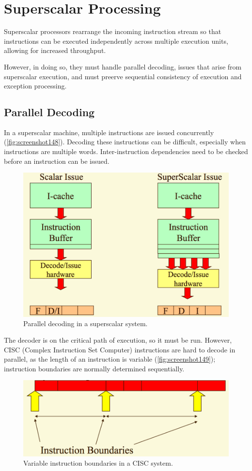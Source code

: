 \chapter{Superscalar Processing}
Superscalar processors rearrange the incoming instruction stream so that instructions can be executed independently across multiple execution units, allowing for increased throughput.

However, in doing so, they must handle parallel decoding, issues that arise from superscalar execution, and must preerve sequential consistency of execution and exception processing.

\section{Parallel Decoding}
In a superscalar machine, multiple instructions are issued concurrently (\autoref{fig:screenshot148}). Decoding these instructions can be difficult, especially when instructions are multiple words. Inter-instruction dependencies need to be checked before an instruction can be issued.

\begin{figure}
\centering
\includegraphics[width=0.7\linewidth]{figures/screenshot148}
\caption{Parallel decoding in a superscalar system.}
\label{fig:screenshot148}
\end{figure}

The decoder is on the critical path of execution, so it must be run. However, CISC (Complex Instruction Set Computer) instructions are hard to decode in parallel, as the length of an instruction is variable (\autoref{fig:screenshot149}); instruction boundaries are normally determined sequentially.

\begin{figure}
\centering
\includegraphics[width=0.7\linewidth]{figures/screenshot149}
\caption{Variable instruction boundaries in a CISC system.}
\label{fig:screenshot149}
\end{figure}

